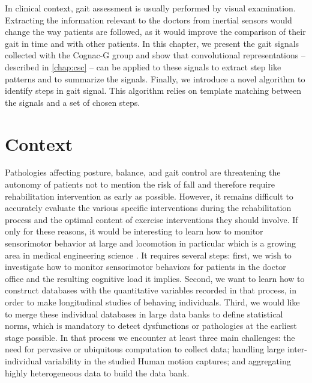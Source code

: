 \documentclass[../thesis.tex]{subfiles}
\begin{document}
In clinical context, gait assessment is usually performed by visual examination. Extracting the information relevant to the doctors from inertial sensors would change the way patients are followed, as it would improve the comparison of their gait in time and with other patients. In this chapter, we present the gait signals collected with the Cognac-G group and show that convolutional representations -- described in \autoref{chap:csc} -- can be applied to these signals to extract step like patterns and to summarize the signals. Finally, we introduce a novel algorithm to identify steps in gait signal. This algorithm relies on template matching between the signals and a set of chosen steps.



\section{Context}
\label{sec:walk:context}

Pathologies affecting posture, balance, and gait control are threatening the autonomy of patients not to mention the risk of fall and therefore require rehabilitation intervention as early as possible. However, it remains difficult to accurately evaluate  the various specific interventions during the rehabilitation process and the optimal content of exercise interventions they should involve.  If only for these reasons, it would be interesting to learn how to monitor sensorimotor behavior at large and locomotion in particular which is a growing area in medical engineering science \citep{mariani, marschollek2008performance, willemsen1990automatic, dijkstra2008detection, han2006gait, Ayachi2016, williamson2000gait}. It requires several steps: first, we wish to investigate how to monitor sensorimotor behaviors for patients in the doctor office and the resulting cognitive load it implies. Second, we want to learn how to construct databases with the quantitative variables recorded in that process, in order to make longitudinal studies of behaving individuals. Third, we would like to merge these individual databases in large data banks to define statistical norms, which is mandatory to detect dysfunctions or pathologies at the earliest stage possible. In that process we encounter at least three main challenges: the need for pervasive or ubiquitous computation to collect data; handling large inter-individual variability in the studied Human motion captures; and aggregating highly heterogeneous data to build the data bank.
\end{document}
